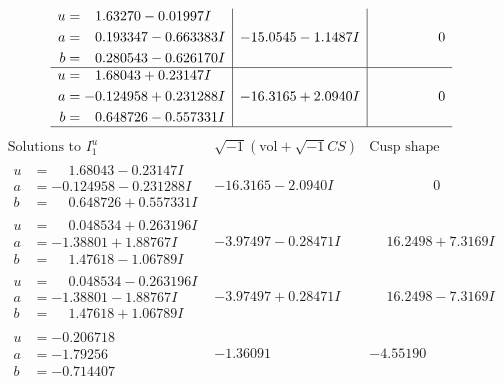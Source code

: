 \documentclass[1p]{elsarticle_modified}
\theoremstyle{definition}
\newcommand{\I}{\sqrt{-1}}
\begin{document}
$$\begin{array}{c|c|c}
\begin{aligned}
u &= \phantom{-}1.63270 - 0.01997 I \\
a &= \phantom{-}0.193347 - 0.663383 I \\
b &= \phantom{-}0.280543 - 0.626170 I\end{aligned}
 & -15.0545 - 1.1487 I & \phantom{-0.000000 } 0 \\ \hline\begin{aligned}
u &= \phantom{-}1.68043 + 0.23147 I \\
a &= -0.124958 + 0.231288 I \\
b &= \phantom{-}0.648726 - 0.557331 I\end{aligned}
 & -16.3165 + 2.0940 I & \phantom{-0.000000 } 0\\
 \hline 
 \end{array}$$\newpage$$\begin{array}{c|c|c}  
\text{Solutions to }I^u_{1}& \I (\text{vol} + \sqrt{-1}CS) & \text{Cusp shape}\\
 \hline 
\begin{aligned}
u &= \phantom{-}1.68043 - 0.23147 I \\
a &= -0.124958 - 0.231288 I \\
b &= \phantom{-}0.648726 + 0.557331 I\end{aligned}
 & -16.3165 - 2.0940 I & \phantom{-0.000000 } 0 \\ \hline\begin{aligned}
u &= \phantom{-}0.048534 + 0.263196 I \\
a &= -1.38801 + 1.88767 I \\
b &= \phantom{-}1.47618 - 1.06789 I\end{aligned}
 & -3.97497 - 0.28471 I & \phantom{-}16.2498 + 7.3169 I \\ \hline\begin{aligned}
u &= \phantom{-}0.048534 - 0.263196 I \\
a &= -1.38801 - 1.88767 I \\
b &= \phantom{-}1.47618 + 1.06789 I\end{aligned}
 & -3.97497 + 0.28471 I & \phantom{-}16.2498 - 7.3169 I \\ \hline\begin{aligned}
u &= -0.206718\phantom{ +0.000000I} \\
a &= -1.79256\phantom{ +0.000000I} \\
b &= -0.714407\phantom{ +0.000000I}\end{aligned}
 & -1.36091\phantom{ +0.000000I} & -4.55190\phantom{ +0.000000I} \\ \hline\begin{aligned}

\end{aligned}
\end{array}$$
\end{document}
